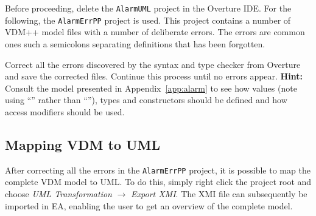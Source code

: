 
%

Before proceeding, delete the \texttt{AlarmUML} project in the Overture IDE.
For the following, the \texttt{AlarmErrPP} project is used. This project contains 
a number of VDM++ model files with a number of
deliberate errors.  The errors are common ones such a
semicolons separating definitions that has been forgotten.

\begin{myhardexercise}\label{ex:type-errors}
Correct all the errors discovered by the syntax and type checker from
Overture and save the corrected files. Continue this process until no errors appear.
\textbf{Hint:} Consult the model presented in 
Appendix~\ref{app:alarm}
to see how values (note using ``\vdmstyle{=}'' rather than
``\vdmstyle{:=}''), types and constructors should be defined and how
access modifiers should be used.
\end{myhardexercise}


\subsection{Mapping VDM to UML}

After correcting all the errors in the \texttt{AlarmErrPP} project, it is possible
to map the complete VDM model to UML. To do this, simply right
click the project root and choose \emph{UML Transformation} $
\rightarrow $ \emph{Export XMI}. The XMI file can subsequently be
imported in EA, enabling the user to get an overview
of the complete model.


